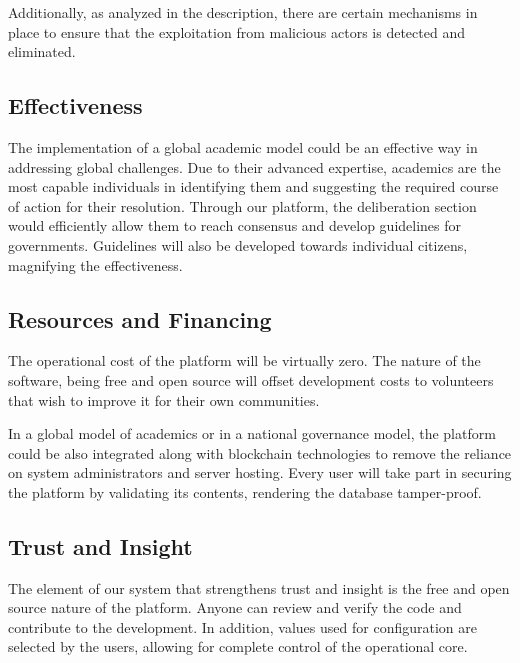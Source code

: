 \documentclass[a4paper,11pt]{article}
\begin{document}
\begin{multicols}{2}
Additionally, as analyzed in the description, there are certain mechanisms in place to ensure that the exploitation from malicious actors is detected and eliminated.

\subsection{Effectiveness} \label{effectiveness}

The implementation of a global academic model could be an effective way in addressing global challenges. Due to their advanced expertise, academics are the most capable individuals in identifying them and suggesting the required course of action for their resolution. Through our platform, the deliberation section would efficiently allow them to reach consensus and develop guidelines for governments. Guidelines will also be developed towards individual citizens, magnifying the effectiveness.

\begin{figure}[hb]
\centering
\resizebox{20mm}{!}{}
\label{TDFlogo}
\end{figure}

\subsection{Resources and Financing} \label{resources}

The operational cost of the platform will be virtually zero. The nature of the software, being free and open source will offset development costs to volunteers that wish to improve it for their own communities.

In a global model of academics or in a national governance model, the platform could be also integrated along with blockchain technologies to remove the reliance on system administrators and server hosting. Every user will take part in securing the platform by validating its contents, rendering the database tamper-proof.

\subsection{Trust and Insight} \label{trust}

The element of our system that strengthens trust and insight is the free and open source nature of the platform. Anyone can review and verify the code and contribute to the development. In addition, values used for configuration are selected by the users, allowing for complete control of the operational core.


\end{multicols}
\end{document}
